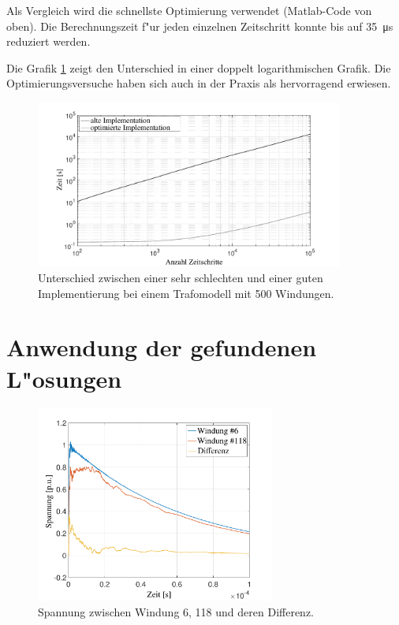 \begin{refsection}
Als Vergleich wird die schnellste Optimierung verwendet (Matlab-Code von oben). Die Berechnungszeit f"ur jeden einzelnen Zeitschritt konnte bis auf \SI{35}{\micro \second} reduziert werden. 

Die Grafik \ref{trafo:Optimierung} zeigt den Unterschied in einer doppelt logarithmischen Grafik. Die Optimierungsversuche haben sich auch in der Praxis als hervorragend erwiesen.

\begin{figure}
	\centering
	\includegraphics[width=0.9\textwidth]{./trafo/images/differenceOptimization.pdf}
	\caption{Unterschied zwischen einer sehr schlechten und einer guten Implementierung bei einem Trafomodell mit 500 Windungen.}
	\label{trafo:Optimierung}
\end{figure}

\section{Anwendung der gefundenen L"osungen}

\begin{figure}
	\centering
	\includegraphics[width=0.7\textwidth]{./trafo/images/solution.pdf}
	\caption{Spannung zwischen Windung 6, 118 und deren Differenz.}
	\label{fig:solution}
\end{figure}


\end{refsection}
